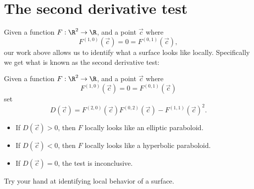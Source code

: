 \documentclass{ximera}
\begin{document}
\section{The second derivative test}

Given a function $F:\R^2\to \R$, and a point $\vec{c}$ where
\[
F^{(1,0)}(\vec{c}) = 0 = F^{(0,1)}(\vec{c}),
\]
our work above allows us to identify what a surface looks like
locally. Specifically we get what is known as the second derivative test:

\begin{theorem}
  Given a function $F:\R^2\to \R$, and a point $\vec{c}$ where
  \[
  F^{(1,0)}(\vec{c}) = 0 = F^{(0,1)}(\vec{c}) 
  \]
  set
  \[
  D(\vec{c}) = F^{(2,0)}(\vec{c})F^{(0,2)}(\vec{c})-F^{(1,1)}(\vec{c})^2.
  \]
  \begin{itemize}
  \item If $D(\vec{c})>0$, then $F$ locally looks like an elliptic paraboloid.
  \item	If $D(\vec{c})<0$, then $F$ locally looks like a hyperbolic paraboloid.
  \item If $D(\vec{c})=0$, the test is inconclusive.
  \end{itemize}
\end{theorem}

Try your hand at identifying local behavior of a surface.
\end{document}
